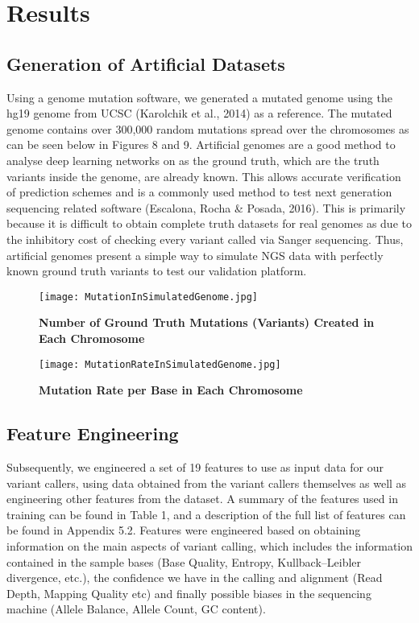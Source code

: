 \documentclass{article}
\begin{document}
\newpage
\section{Results}
\subsection{Generation of Artificial Datasets}
Using a genome mutation software, we generated a mutated genome using the hg19 genome from UCSC (Karolchik et al., 2014) as a reference. The mutated genome contains over 300,000 random mutations spread over the chromosomes as can be seen below in Figures 8 and 9. Artificial genomes are a good method to analyse deep learning networks on as the ground truth, which are the truth variants inside the genome, are already known. This allows accurate verification of prediction schemes and is a commonly used method to test next generation sequencing related software (Escalona, Rocha \& Posada, 2016). This is primarily because it is difficult to obtain complete truth datasets for real genomes as due to the inhibitory cost of checking every variant called via Sanger sequencing. Thus, artificial genomes present a simple way to simulate NGS data with perfectly known ground truth variants to test our validation platform.

\begin{figure}[H]
\centering
\texttt{[image: MutationInSimulatedGenome.jpg]}
\caption{\textbf{Number of Ground Truth Mutations (Variants) Created in Each Chromosome}}
\end{figure}

\begin{figure}[H]
\centering
\texttt{[image: MutationRateInSimulatedGenome.jpg]}
\caption{\textbf{Mutation Rate per Base in Each Chromosome}}
\end{figure}

\subsection{Feature Engineering}
Subsequently, we engineered a set of 19 features to use as input data for our variant callers, using data obtained from the variant callers themselves as well as engineering other features from the dataset. A summary of the features used in training can be found in Table 1, and a description of the full list of features can be found in Appendix 5.2. Features were engineered based on obtaining information on the main aspects of variant calling, which includes the information contained in the sample bases (Base Quality, Entropy, Kullback–Leibler divergence, etc.), the confidence we have in the calling and alignment (Read Depth, Mapping Quality etc) and finally possible biases in the sequencing machine (Allele Balance, Allele Count, GC content).
\end{document}
